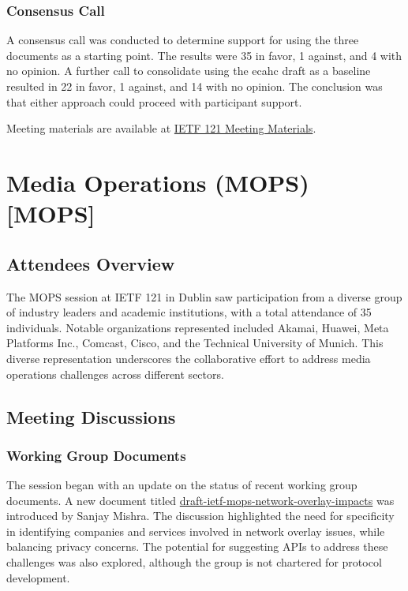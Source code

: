 \documentclass{article}
\begin{document}
\subsubsection{Consensus Call}
A consensus call was conducted to determine support for using the three documents as a starting point. The results were 35 in favor, 1 against, and 4 with no opinion. A further call to consolidate using the ecahc draft as a baseline resulted in 22 in favor, 1 against, and 14 with no opinion. The conclusion was that either approach could proceed with participant support.

Meeting materials are available at \href{https://datatracker.ietf.org/meeting/121/materials}{IETF 121 Meeting Materials}.


\newpage

\section{Media Operations (MOPS) [MOPS]}

\subsection{Attendees Overview}

The MOPS session at IETF 121 in Dublin saw participation from a diverse group of industry leaders and academic institutions, with a total attendance of 35 individuals. Notable organizations represented included Akamai, Huawei, Meta Platforms Inc., Comcast, Cisco, and the Technical University of Munich. This diverse representation underscores the collaborative effort to address media operations challenges across different sectors.

\subsection{Meeting Discussions}

\subsubsection{Working Group Documents}

The session began with an update on the status of recent working group documents. A new document titled \href{https://datatracker.ietf.org/doc/html/draft-deen-mops-network-overlay-impacts}{draft-ietf-mops-network-overlay-impacts} was introduced by Sanjay Mishra. The discussion highlighted the need for specificity in identifying companies and services involved in network overlay issues, while balancing privacy concerns. The potential for suggesting APIs to address these challenges was also explored, although the group is not chartered for protocol development.
\end{document}

